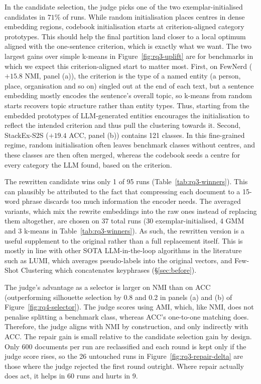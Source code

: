 \documentclass[11pt,a4paper,oneside]{report}
\begin{document}
In the candidate selection, the judge picks one of the two
exemplar-initialised candidates in $71\%$ of runs. While random initialisation places centres in dense embedding regions, codebook initialisation starts at criterion-aligned category prototypes. This should help the final partition land closer to a local optimum aligned with the one-sentence criterion, which is exactly what we want. The two largest gains over simple k-means in Figure~\ref{fig:rq3-uplift} are for benchmarks in which we expect this criterion-aligned start to matter most. First, on FewNerd ($+15.8$ NMI, panel (a)), the criterion is the type of a named entity (a
person, place, organisation and so on) singled out at the end of each
text, but a sentence embedding mostly encodes the sentence's overall
topic, so k-means from random starts recovers topic structure rather
than entity types. Thus, starting from the embedded prototypes of LLM-generated entities encourages the initialisation to reflect the intended criterion and thus pull the clustering towards it. Second, StackEx-S2S ($+19.4$ ACC, panel (b)) contains 121 classes. In this fine-grained regime, random initialisation often leaves benchmark classes without centres, and these classes are then often merged, whereas the codebook seeds a centre for every category the LLM found, based on the criterion.

The rewritten candidate wins only 1 of 95 runs
(Table~\ref{tab:rq3-winners}). This can plausibly be attributed to the fact that compressing each document to a 15-word phrase discards too much information the encoder needs. The averaged variants, which mix the rewrite embeddings into the raw ones instead of replacing
them altogether, are chosen on 37 total runs (30 exemplar-initialised, 4 GMM and 3 k-means in Table~\ref{tab:rq3-winners}). As such, the rewritten version is a useful supplement to the original rather than a full replacement itself. This is mostly in line with other SOTA LLM-in-the-loop algorithms in the literature such as LUMI, which averages pseudo-labels into the original vectors, and Few-Shot Clustering which concatenates keyphrases (\S\ref{sec:before}).


The judge's advantage as a selector is larger on NMI than on ACC (outperforming silhouette selection by 0.8 and 0.2 in panels (a) and (b) of Figure~\ref{fig:rq4-selector}). The judge scores using AMI, which, like NMI, does not penalise splitting a benchmark class, whereas ACC's one-to-one matching does. Therefore, the judge aligns with NMI by construction, and only indirectly with ACC. The repair gain is small relative to the candidate selection gain by design. Only 600 documents per run are reclassified and each round is kept only if
the judge score rises, so the 26 untouched runs in
Figure~\ref{fig:rq3-repair-delta} are those where the judge rejected the
first round outright. Where repair actually does act, it helps in 60 runs and hurts in 9. 
\end{document}
